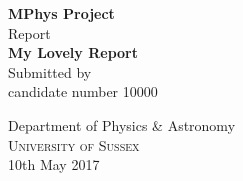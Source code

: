 \begin{titlepage}

\begin{center}

\textup{\small {\bf MPhys Project} \\ Report}\\[0.2in]

\Large \textbf {My Lovely Report}\\[0.5in]


\normalsize Submitted by \\
\centering
candidate number 10000


\vfill

\Large{Department of Physics \& Astronomy}\\
\normalsize
\textsc{University of Sussex} \\
\vspace{0.2cm}
10th May 2017

\end{center}

\end{titlepage}
